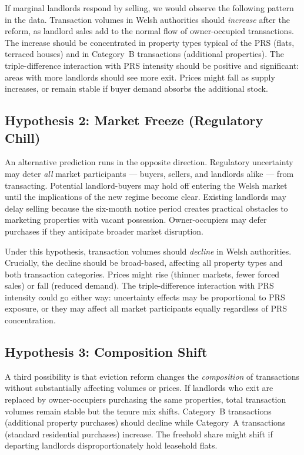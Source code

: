 \documentclass[12pt]{article}
\begin{document}
If marginal landlords respond by selling, we would observe the following pattern in the data. Transaction volumes in Welsh authorities should \textit{increase} after the reform, as landlord sales add to the normal flow of owner-occupied transactions. The increase should be concentrated in property types typical of the PRS (flats, terraced houses) and in Category~B transactions (additional properties). The triple-difference interaction with PRS intensity should be positive and significant: areas with more landlords should see more exit. Prices might fall as supply increases, or remain stable if buyer demand absorbs the additional stock.

\subsection{Hypothesis 2: Market Freeze (Regulatory Chill)}

An alternative prediction runs in the opposite direction. Regulatory uncertainty may deter \textit{all} market participants --- buyers, sellers, and landlords alike --- from transacting. Potential landlord-buyers may hold off entering the Welsh market until the implications of the new regime become clear. Existing landlords may delay selling because the six-month notice period creates practical obstacles to marketing properties with vacant possession. Owner-occupiers may defer purchases if they anticipate broader market disruption.

Under this hypothesis, transaction volumes should \textit{decline} in Welsh authorities. Crucially, the decline should be broad-based, affecting all property types and both transaction categories. Prices might rise (thinner markets, fewer forced sales) or fall (reduced demand). The triple-difference interaction with PRS intensity could go either way: uncertainty effects may be proportional to PRS exposure, or they may affect all market participants equally regardless of PRS concentration.

\subsection{Hypothesis 3: Composition Shift}

A third possibility is that eviction reform changes the \textit{composition} of transactions without substantially affecting volumes or prices. If landlords who exit are replaced by owner-occupiers purchasing the same properties, total transaction volumes remain stable but the tenure mix shifts. Category~B transactions (additional property purchases) should decline while Category~A transactions (standard residential purchases) increase. The freehold share might shift if departing landlords disproportionately hold leasehold flats.
\end{document}
